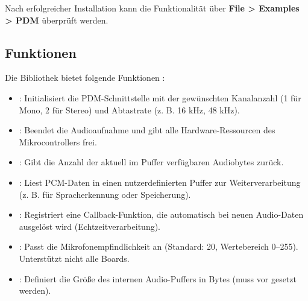 Nach erfolgreicher Installation kann die Funktionalität über \textbf{File > Examples > PDM} überprüft werden.



\subsection{Funktionen}

Die Bibliothek bietet folgende Funktionen \cite{ArduinoPDM:2023}:

\begin{itemize}
	\item {}: Initialisiert die PDM-Schnittstelle mit der gewünschten Kanalanzahl (1 für Mono, 2 für Stereo) und Abtastrate (z. B. 16 kHz, 48 kHz).
	\item {}: Beendet die Audioaufnahme und gibt alle Hardware-Ressourcen des Mikrocontrollers frei.
	\item {}: Gibt die Anzahl der aktuell im Puffer verfügbaren Audiobytes zurück.
	\item {}: Liest PCM-Daten in einen nutzerdefinierten Puffer zur Weiterverarbeitung (z. B. für Spracherkennung oder Speicherung).
	\item {}: Registriert eine Callback-Funktion, die automatisch bei neuen Audio-Daten ausgelöst wird (Echtzeitverarbeitung).
	\item {}: Passt die Mikrofonempfindlichkeit an (Standard: 20, Wertebereich 0–255). Unterstützt nicht alle Boards.
	\item {}: Definiert die Größe des internen Audio-Puffers in Bytes (muss vor  gesetzt werden).
\end{itemize}




